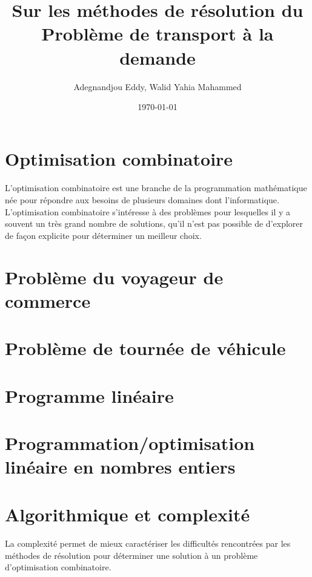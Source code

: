 \documentclass{article}
\begin{document}
\title{Sur les méthodes de résolution du Problème de transport à la demande}
\author{Adegnandjou Eddy, Walid Yahia Mahammed}
\date{\today}
\maketitle

\newpage

\section{Optimisation combinatoire}

\paragraph{}
L'optimisation combinatoire est une branche de la programmation mathématique née pour répondre aux besoins de plusieurs domaines dont l'informatique. L'optimisation combinatoire s'intéresse à des problèmes pour lesquelles il y a souvent un très grand nombre de solutions, qu'il n'est pas possible de d'explorer de façon explicite pour déterminer un meilleur choix.

\section{Problème du voyageur de commerce}

\section{Problème de tournée de véhicule}

\section{Programme linéaire}

\section{Programmation/optimisation linéaire en nombres entiers}

\section{Algorithmique et complexité}

\paragraph{}
La complexité permet de mieux caractériser les difficultés rencontrées par les méthodes de résolution pour déterminer une solution à un problème d'optimisation combinatoire.
\end{document}
